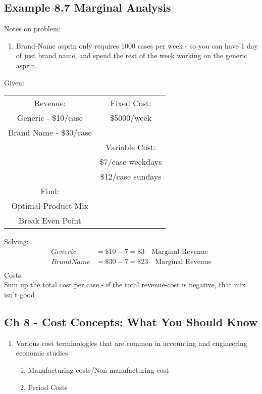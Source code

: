 \documentclass{report} %
\begin{document}
\subsection*{Example 8.7 Marginal Analysis}
Notes on problem:
\begin{enumerate}
    \item Brand-Name asprin only requires 1000 cases per week - so you can have 1 day of just brand name, and spend the rest of the week working on the generic asprin.
\end{enumerate}
Given:
\begin{tabular}{c c}
    Revenue: & Fixed Cost: \\
    Generic - \$10/case & \$5000/week \\
    Brand Name - \$30/case & \\
     & Variable Cost: \\
     & \$7/case weekdays \\
     &  \$12/case sundays \\
     Find: & \\
     Optimal Product Mix & \\
     Break Even Point & \\
\end{tabular}
Solving:
\begin{equation*}
    \begin{aligned}
        Generic &= \$10-7 = \$3 \quad \text{Marginal Revenue} \\
        BrandName &= \$30-7 = \$ 23 \quad \text{Marginal Revenue} \\
    \end{aligned}
\end{equation*}
Costs: \\
Sum up the total cost per case - if the total revenue-cost is negative, that mix isn't good
\subsection*{Ch 8 - Cost Concepts: What You Should Know}
\begin{enumerate}
    \item Various cost terminologies that are common in accounting and engineering economic studies
        \begin{enumerate}
            \item Manufacturing costs/Non-manufacturing cost
            \item Period Costs
        \end{enumerate}
\end{enumerate}
\end{document}
